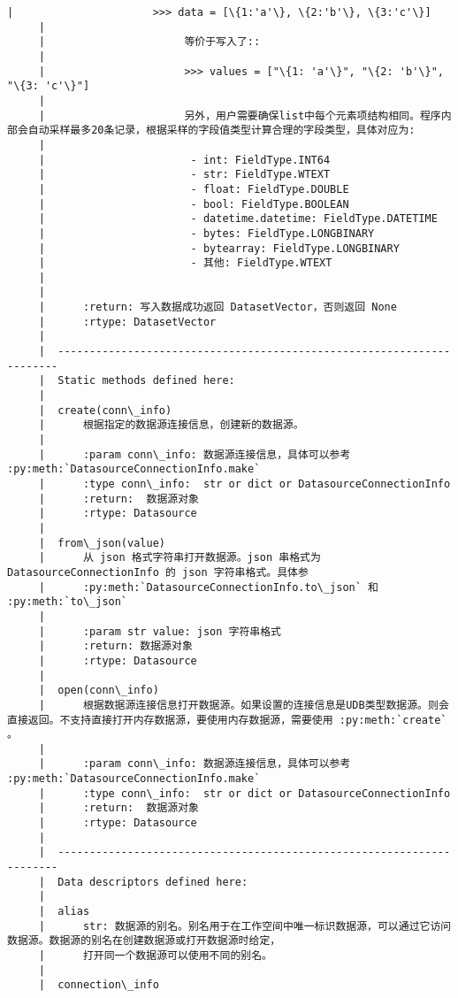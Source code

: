 \documentclass[11pt]{article}
\begin{document}
\begin{Verbatim}[commandchars=\\\{\}]
     |                      >>> data = [\{1:'a'\}, \{2:'b'\}, \{3:'c'\}]
     |      
     |                      等价于写入了::
     |      
     |                      >>> values = ["\{1: 'a'\}", "\{2: 'b'\}", "\{3: 'c'\}"]
     |      
     |                      另外，用户需要确保list中每个元素项结构相同。程序内部会自动采样最多20条记录，根据采样的字段值类型计算合理的字段类型，具体对应为:
     |      
     |                       - int: FieldType.INT64
     |                       - str: FieldType.WTEXT
     |                       - float: FieldType.DOUBLE
     |                       - bool: FieldType.BOOLEAN
     |                       - datetime.datetime: FieldType.DATETIME
     |                       - bytes: FieldType.LONGBINARY
     |                       - bytearray: FieldType.LONGBINARY
     |                       - 其他: FieldType.WTEXT
     |      
     |      
     |      :return: 写入数据成功返回 DatasetVector，否则返回 None
     |      :rtype: DatasetVector
     |  
     |  ----------------------------------------------------------------------
     |  Static methods defined here:
     |  
     |  create(conn\_info)
     |      根据指定的数据源连接信息，创建新的数据源。
     |      
     |      :param conn\_info: 数据源连接信息，具体可以参考 :py:meth:`DatasourceConnectionInfo.make`
     |      :type conn\_info:  str or dict or DatasourceConnectionInfo
     |      :return:  数据源对象
     |      :rtype: Datasource
     |  
     |  from\_json(value)
     |      从 json 格式字符串打开数据源。json 串格式为 DatasourceConnectionInfo 的 json 字符串格式。具体参
     |      :py:meth:`DatasourceConnectionInfo.to\_json` 和 :py:meth:`to\_json`
     |      
     |      :param str value: json 字符串格式
     |      :return: 数据源对象
     |      :rtype: Datasource
     |  
     |  open(conn\_info)
     |      根据数据源连接信息打开数据源。如果设置的连接信息是UDB类型数据源。则会直接返回。不支持直接打开内存数据源，要使用内存数据源，需要使用 :py:meth:`create` 。
     |      
     |      :param conn\_info: 数据源连接信息，具体可以参考 :py:meth:`DatasourceConnectionInfo.make`
     |      :type conn\_info:  str or dict or DatasourceConnectionInfo
     |      :return:  数据源对象
     |      :rtype: Datasource
     |  
     |  ----------------------------------------------------------------------
     |  Data descriptors defined here:
     |  
     |  alias
     |      str: 数据源的别名。别名用于在工作空间中唯一标识数据源，可以通过它访问数据源。数据源的别名在创建数据源或打开数据源时给定，
     |      打开同一个数据源可以使用不同的别名。
     |  
     |  connection\_info

\end{Verbatim}
\end{document}
